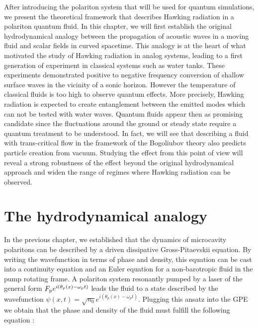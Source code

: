 After introducing the polariton system that will be used for quantum simulations, we present the theoretical framework that  
describes Hawking radiation in a polariton quantum fluid. In this chapter, we will first establish the original hydrodynamical analogy between the propagation 
of acoustic waves in a moving fluid and scalar fields in curved spacetime. This analogy is at the heart of what motivated the study 
of Hawking radiation in analog systems, leading to a first generation of experiment in classical systems such as water tanks. These experiments
\cite{rousseaux_observation_2008,weinfurtner_measurement_2011} demonstrated positive to negative frequency conversion of shallow surface waves in the vicinity of a sonic horizon. However the temperature
of classical fluids is too high to observe quantum effects. More precisely, Hawking radiation is expected to create entanglement between the emitted modes which can not be tested with water waves. 
Quantum fluids appear then as promising candidate since the 
fluctuations around the ground or steady state require a quantum treatment to be understood. In fact, we will see that describing a fluid with trans-critical flow in the framework of the Bogoliubov theory also predicts particle creation from vacuum. Studying the effect from this point of view will reveal a strong robustness 
of the effect beyond the original hydrodynamical approach and widen the range of regimes where Hawking radiation can be observed.


\section{The hydrodynamical analogy}

In the previous chapter, we established that the dynamics of microcavity polaritons can be described by a driven dissipative Gross-Pitaevskii equation.
By writing the wavefunction in terms of phase and density, this equation can be cast into a continuity equation and an Euler equation for a non-barotropic fluid in the pump rotating frame. A polariton system resonantly pumped by a laser of the general form $F_{\mathrm{p}}e^{i(\theta_p(x)-\omega_p t)}$ leads the fluid to a state described by the wavefunction $\psi(x,t)=\sqrt{n_0}e^{i(\theta_p(x)-\omega_p t)}$. Plugging this ansatz into the GPE we obtain that the phase and density of the fluid must fulfill the following equation :

